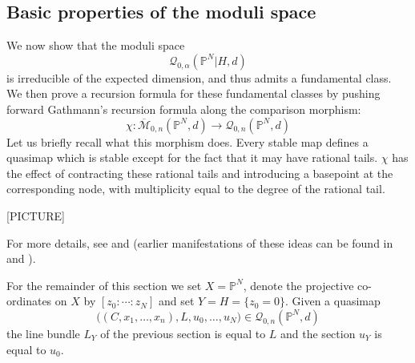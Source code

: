 \documentclass[11pt]{amsart}
\newcommand{\M}[4]{\overline{\mathcal{M}}_{#1,#2}(#3,#4)}
\newcommand{\Q}[4]{\mathcal{Q}_{#1,#2}(#3,#4)}
\newcommand{\PP}{\mathbb P}
\renewcommand{\to}{\rightarrow}
\theoremstyle{definition}
\theoremstyle{definition}
\begin{document}
\subsection{Basic properties of the moduli space} \label{Subsection basic properties of the moduli space}
We now show that the moduli space
\begin{equation*} \Q{0}{\alpha}{\PP^N|H}{d} \end{equation*}
is irreducible of the expected dimension, and thus admits a fundamental class. We then prove a recursion formula for these fundamental classes by pushing forward Gathmann's recursion formula along the comparison morphism:
\begin{equation*}\chi : \M{0}{n}{\PP^N}{d} \to \Q{0}{n}{\PP^N}{d} \end{equation*}
Let us briefly recall what this morphism does. Every stable map defines a quasimap which is stable except for the fact that it may have rational tails. $\chi$ has the effect of contracting these rational tails and introducing a basepoint at the corresponding node, with multiplicity equal to the degree of the rational tail. 

[PICTURE]

For more details, see \cite[Theorem 3]{MOP} and \cite[Section 4.3]{Manolache-Push} (earlier manifestations of these ideas can be found in \cite{Bertram} and \cite{Popa-Roth}).

For the remainder of this section we set $X=\PP^N$, denote the projective co-ordinates on $X$ by $[z_0: \cdots: z_N]$ and set $Y=H=\{ z_0 = 0 \}$. Given a quasimap
\begin{equation*} \big((C,x_1,\ldots,x_n), L, u_0,\ldots,u_N\big) \in \Q{0}{n}{\PP^N}{d} \end{equation*}
the line bundle $L_Y$ of the previous section is equal to $L$ and the section $u_Y$ is equal to $u_0$.
\end{document}
